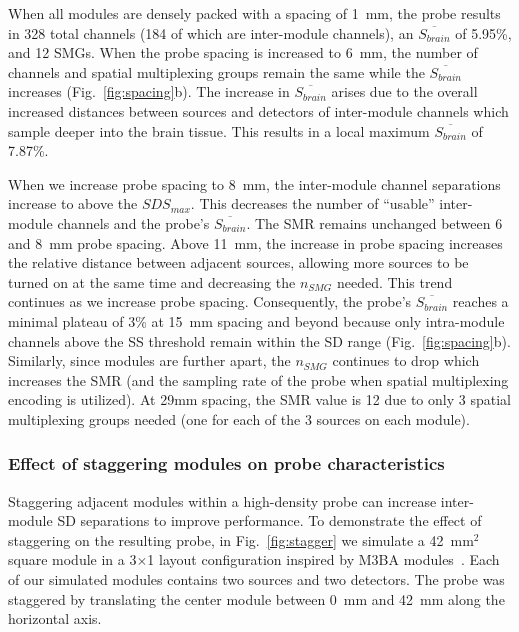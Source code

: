 When all modules are densely packed with a spacing of 1~mm, the probe results in 328 total channels (184 of which are inter-module channels), an $\overline{S_{brain}}$ of 5.95\%, and 12 SMGs. When the probe spacing is increased to 6~mm, the number of channels and spatial multiplexing groups remain the same while the $\overline{S_{brain}}$ increases (Fig.~\ref{fig:spacing}b). The increase in $\overline{S_{brain}}$ arises due to the overall increased distances between sources and detectors of inter-module channels which sample deeper into the brain tissue. This results in a local maximum $\overline{S_{brain}}$ of 7.87\%. 

When we increase probe spacing to 8~mm, the inter-module channel separations increase to above the $SDS_{max}$. This decreases the number of ``usable'' inter-module channels and the probe's $\overline{S_{brain}}$. The SMR remains unchanged between 6 and 8~mm probe spacing. Above 11~mm, the increase in probe spacing increases the relative distance between adjacent sources, allowing more sources to be turned on at the same time and decreasing the $n_{SMG}$ needed. This trend continues as we increase probe spacing. Consequently, the probe's $\overline{S_{brain}}$ reaches a minimal plateau of 3\% at 15~mm spacing and beyond because only intra-module channels above the SS threshold remain within the SD range (Fig.~\ref{fig:spacing}b). Similarly, since modules are further apart, the $n_{SMG}$ continues to drop which increases the SMR (and the sampling rate of the probe when spatial multiplexing encoding is utilized). At 29mm spacing, the SMR value is 12 due to only 3 spatial multiplexing groups needed (one for each of the 3 sources on each module).

\subsubsection{Effect of staggering modules on probe characteristics}
Staggering adjacent modules within a high-density probe can increase inter-module SD separations to improve performance. To demonstrate the effect of staggering on the resulting probe, in Fig.~\ref{fig:stagger} we simulate a 42~$\textrm{mm}^2$ square module in a 3$\times$1 layout configuration inspired by M3BA modules~\cite{Bci2017}. Each of our simulated modules contains two sources and two detectors. The probe was staggered by translating the center module between 0~mm and 42~mm along the horizontal axis.

